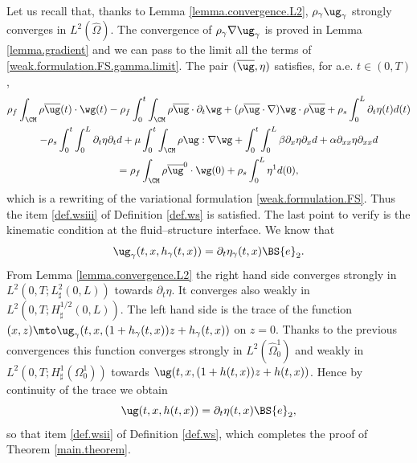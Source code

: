 Let us recall that, thanks to Lemma \ref{lemma.convergence.L2}, $\rho_\gamma \ug_{\gamma}$ strongly converges in $L^2(\hat\Omega)$. The convergence of $\rho_{\gamma} \nabla\ug_{\gamma}$ is proved in Lemma \ref{lemma.gradient} and we can pass to the limit all the terms of \eqref{weak.formulation.FS.gamma.limit}. The pair $(\overline{\ug},\eta)$ satisfies, for a.e. $t\in(0,T)$,
\begin{multline*}
\rho_{f}\int_{\CM}\rho\overline{\ug}(t)\cdot\wg(t) -\rho_{f}\int_{0}^{t}\int_{\CM}\rho\overline{\ug}\cdot\partial_{t}\wg + (\rho\overline{\ug}\cdot\nabla)\wg\cdot\rho\overline{\ug}+\rho_{s}\int_{0}^{L}\partial_{t}\eta(t)d(t)\\
-\rho_{s}\int_{0}^{t}\int_{0}^{L}\partial_{t}\eta\partial_{t}d+\mu\int_{0}^{t}\int_{\CM}\rho \ug:\nabla\wg
+\int_{0}^{t}\int_{0}^{L}\beta\partial_{x}\eta\partial_{x}d + \alpha\partial_{xx}\eta\partial_{xx}d\\
=\rho_{f}\int_{\CM}\rho\overline{\ug}^{0}\cdot\wg(0)+\rho_{s}\int_{0}^{L}\eta^{1}d(0),
\end{multline*}
which is a rewriting of the variational formulation \eqref{weak.formulation.FS}. Thus the item \eqref{def.wsiii} of Definition \ref{def.ws} is satisfied.
The last point to verify is the kinematic condition at the fluid--structure interface. We know that
\[
\ug_\gamma(t, x, h_\gamma(t, x))= \partial_t \eta_\gamma(t, x) \BS{e}_2.
\]
From Lemma \ref{lemma.convergence.L2} the right hand side converges strongly in $L^2(0, T; L_\sharp^2(0, L))$ towards $\partial_t \eta$. It converges also weakly in $L^2(0, T; H_\sharp^{1/2}(0, L))$. The left hand side is the trace of the function $(x, z) \mto \ug_\gamma(t, x, (1+h_\gamma(t, x))z + h_\gamma(t, x))$ on $z=0$. Thanks to the previous convergences this function converges strongly in $L^2(\widehat{\Omega}_0^1)$ and weakly in $L^2(0, T; H^1_\sharp(\Omega_0^1))$ towards $\ug(t, x, (1+h(t, x))z + h(t, x))$. Hence by continuity of the trace we obtain
\[
\ug(t, x, h(t, x))= \partial_t \eta(t, x) \BS{e}_2,
\]
so that item \eqref{def.wsii} of Definition \ref{def.ws}, which completes the proof of Theorem \ref{main.theorem}.

